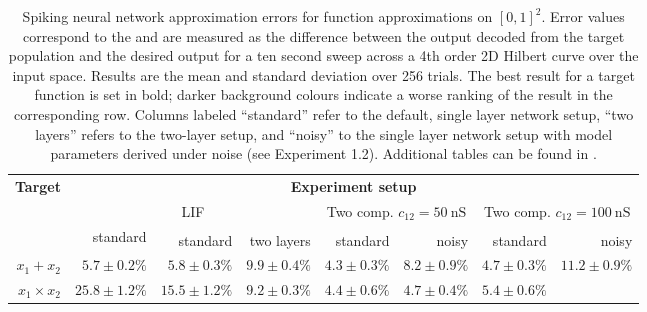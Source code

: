 \begin{table}[t]
	\caption[Spiking neural network approximation errors.]{Spiking neural network approximation errors for function approximations on $[0, 1]^2$. Error values correspond to the \NRMSE and are measured as the difference between the output decoded from the target population and the desired output for a ten second sweep across a 4th order 2D Hilbert curve over the input space. Results are the mean and standard deviation over 256 trials. The best result for a target function is set in bold; darker background colours indicate a worse ranking of the result in the corresponding row. Columns labeled \enquote{standard} refer to the default, single layer network setup, \enquote{two layers} refers to the two-layer setup, and \enquote{noisy} to the single layer network setup with model parameters derived under noise (see Experiment 1.2). Additional tables can be found in .}
	\fontsize{10pt}{12pt}\selectfont
	\renewcommand\arraystretch{1.2}
	\sffamily
	\begin{tabular}{r r r r r r r r }
	\toprule
	\textbf{Target}& \multicolumn{7}{c}{\textbf{Experiment setup}} \\
	\cmidrule(r){1-1}\cmidrule(l){2-8}
	& \multicolumn{3}{c}{%
	LIF}
	& \multicolumn{2}{c}{%
	Two comp. $c_{12} = \SI{50}{\nano\siemens}$}
	& \multicolumn{2}{c}{%
	Two comp. $c_{12} = \SI{100}{\nano\siemens}$}
	\\
	\cmidrule(l){2-4}
	\cmidrule(l){5-6}
	\cmidrule(l){7-8}
	& standard
	& standard\textsuperscript{\dag}
	& two layers\textsuperscript{\dag}
	& %
	standard\textsuperscript{\dag}
	& %
	noisy\textsuperscript{\dag}
	& %
	standard\textsuperscript{\dag}
	& %
	noisy\textsuperscript{\dag}
	\\
	\midrule
	$x_1 + x_2$ 
	& \cellcolor{White!72!SteelBlue}$5.7 \pm 0.2\%$
	& \cellcolor{White!58!SteelBlue}$5.8 \pm 0.3\%$
	& \cellcolor{White!29!SteelBlue}$9.9 \pm 0.4\%$
	& \cellcolor{White!100!SteelBlue}$\mathbf{4.3 \pm 0.3\%}$
	& \cellcolor{White!43!SteelBlue}$8.2 \pm 0.9\%$
	& \cellcolor{White!86!SteelBlue}$4.7 \pm 0.3\%$
	& \cellcolor{White!15!SteelBlue}$11.2 \pm 0.9\%$
	\\
	$x_1 \times x_2$ 
	& \cellcolor{White!15!SteelBlue}$25.8 \pm 1.2\%$
	& \cellcolor{White!29!SteelBlue}$15.5 \pm 1.2\%$
	& \cellcolor{White!43!SteelBlue}$9.2 \pm 0.3\%$
	& \cellcolor{White!100!SteelBlue}$\mathbf{4.4 \pm 0.6\%}$
	& \cellcolor{White!86!SteelBlue}$4.7 \pm 0.4\%$
	& \cellcolor{White!72!SteelBlue}$5.4 \pm 0.6\%$

\end{tabular}
\end{table}
